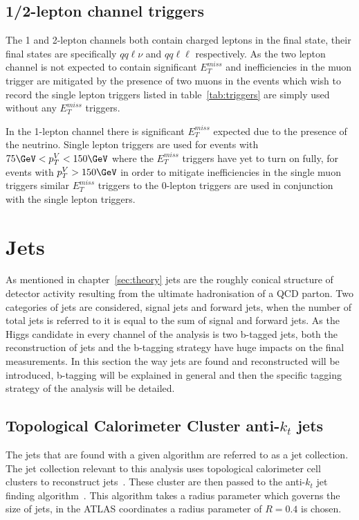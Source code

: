 \subsection{1/2-lepton channel triggers}
The 1 and 2-lepton channels both contain charged leptons in the final state,
their final states are specifically $qq\ell\nu$ and $qq\ell\ell$ respectively.
As the two lepton channel is not expected to contain significant $E_T^{miss}$
and inefficiencies in the muon trigger are mitigated by the presence of two
muons in the events which wish to record the single lepton triggers listed in
table~\ref{tab:triggers} are simply used without any $E_T^{miss}$ triggers.

In the 1-lepton channel there is significant $E_T^{miss}$ expected due to the
presence of the neutrino. Single lepton triggers are used for events with $75
\GeV < p_T^{V} < 150 \GeV$ where the $E_T^{miss}$ triggers have yet to turn on
fully, for events with $p_T^{V} > 150 \GeV$ in order to mitigate inefficiencies
in the single muon triggers similar $E_T^{miss}$ triggers to the 0-lepton
triggers are used in conjunction with the single lepton triggers.


\section{Jets}
\label{sec:jets}

As mentioned in chapter~\ref{sec:theory} jets are the roughly conical structure
of detector activity resulting from the ultimate hadronisation of a QCD parton.
Two categories of jets are considered, signal jets and forward jets, when the
number of total jets is referred to it is equal to the sum of signal and forward
jets. As the Higgs candidate in every channel of the analysis is two b-tagged
jets, both the reconstruction of jets and the b-tagging strategy have huge
impacts on the final measurements. In this section the way jets are found and
reconstructed will be introduced, b-tagging will be explained in general and
then the specific tagging strategy of the analysis will be detailed.

\subsection{Topological Calorimeter Cluster anti-$k_t$ jets}
The jets that are found with a given algorithm are referred to as a jet
collection. The jet collection relevant to this analysis uses topological
calorimeter cell clusters to reconstruct jets~\cite{emtopo}. These cluster are
then passed to the anti-$k_t$ jet finding algorithm~\cite{anti-kt}. This
algorithm takes a radius parameter which governs the size of jets, in the ATLAS
coordinates a radius parameter of $R=0.4$ is chosen.

